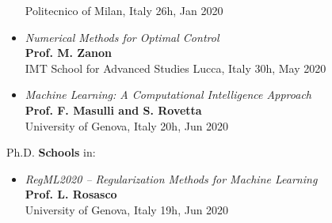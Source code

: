 \documentclass[10pt]{article}
\begin{document}
\begin{itemize}
	Politecnico of Milan, Italy \hfill 26h, Jan 2020\\
	\item \textit{Numerical Methods for Optimal Control}\\
	\textbf{Prof. M. Zanon}\\
	IMT School for Advanced Studies Lucca, Italy \hfill 30h, May 2020\\
	\item \textit{Machine Learning: A Computational Intelligence Approach}\\
	\textbf{Prof. F. Masulli and S. Rovetta}\\
	University of Genova, Italy \hfill 20h, Jun 2020\\
\end{itemize}

\vspace{6pt} %

Ph.D. \textbf{Schools} in:
\begin{itemize}
	\setlength\itemsep{-3pt}
	\renewcommand\labelitemi{$\vcenter{\hbox{\tiny$\bullet$}}$}
	\item \textit{RegML2020 -- Regularization Methods for Machine Learning}\\
	\textbf{Prof. L. Rosasco}\\
	University of Genova, Italy \hfill 19h, Jun 2020\\
\end{itemize}

\vspace{6pt} %
\end{document}
